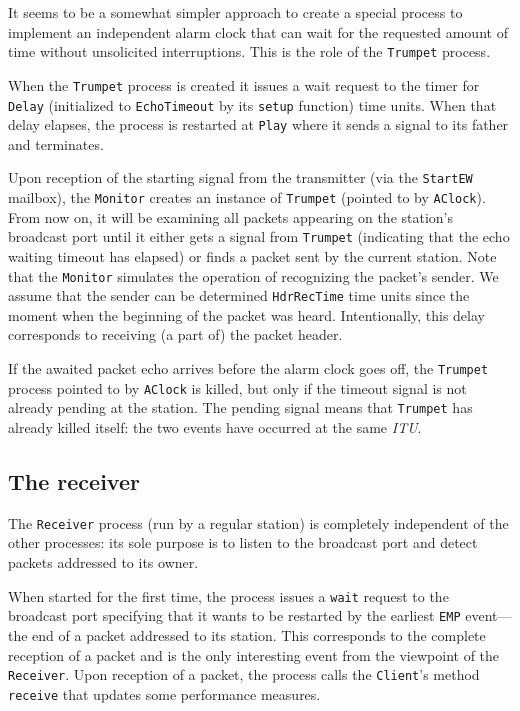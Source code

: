 It seems to be a somewhat simpler approach to create a special process to
implement an independent alarm clock that can wait for the requested amount
of time without unsolicited interruptions.
This is the role of the {\tt Trumpet} process.

When the {\tt Trumpet} process is created
it issues a wait request to the timer for {\tt Delay} (initialized to
{\tt EchoTimeout} by its {\tt setup} function) time units.
When that delay elapses, the process is restarted at {\tt Play}
where it sends a signal to its father and terminates.

Upon reception of the starting signal from the transmitter (via the
{\tt StartEW} mailbox),
the {\tt Monitor} creates an instance
of {\tt Trumpet} (pointed to by {\tt AClock}).
From now on, it will be examining
all packets appearing on the station's broadcast port
until it either gets a signal from {\tt Trumpet} (indicating that the
echo waiting timeout has elapsed)
or finds a packet sent by the current station.
Note that the {\tt Monitor} simulates the operation of recognizing the
packet's sender.
We assume that the sender can be determined {\tt HdrRecTime} time
units since the moment when the beginning of the packet was heard.
Intentionally, this delay corresponds to receiving (a part of) the
packet header.

If the awaited packet echo arrives before the alarm clock goes off,
the {\tt Trumpet} process pointed to by
{\tt AClock} is killed, but only if the timeout signal
is not already pending at the station.
The pending signal means that {\tt Trumpet} has already killed
itself: the two events have occurred at the same {\em ITU}.

\subsection{The receiver}

The {\tt Receiver} process (run by a regular station)
is completely independent of the other processes:
its sole purpose is to listen to the broadcast port and detect packets
addressed to its owner.

When started for the first time, the process
issues a {\tt wait} request to the broadcast port specifying that it wants
to be restarted by the earliest {\tt EMP} event---the end of a packet
addressed to its station.
This corresponds to the complete reception of a packet and is the only
interesting event from the viewpoint of the {\tt Receiver}.
Upon reception of a packet, the process calls the {\tt Client}'s method
{\tt receive} that updates some performance measures.

